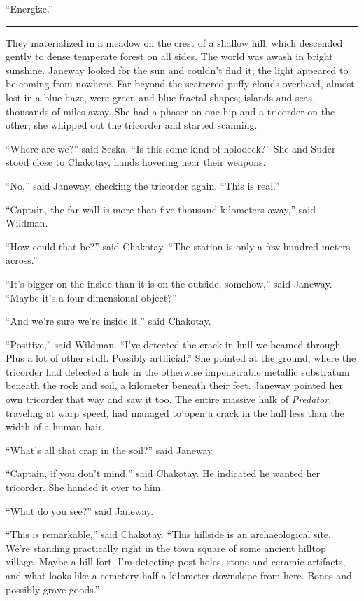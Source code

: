 \documentclass[twoside,letterpaper,12pt]{memoir}
\begin{document}
``Energize.'' 

\fancybreak{\rule{3cm}{0.4 pt}} 

They materialized in a meadow on the crest of a shallow hill, which descended gently to dense temperate forest on all sides. The world was awash in bright sunshine. Janeway looked for the sun and couldn't find it; the light appeared to be coming from nowhere. Far beyond the scattered puffy clouds overhead, almost lost in a blue haze, were green and blue fractal shapes; islands and seas, thousands of miles away. She had a phaser on one hip and a tricorder on the other; she whipped out the tricorder and started scanning. 

``Where are we?'' said Seska. ``Is this some kind of holodeck?'' She and Suder stood close to Chakotay, hands hovering near their weapons. 

``No,'' said Janeway, checking the tricorder again. ``This is real.'' 

``Captain, the far wall is more than five thousand kilometers away,'' said Wildman. 

``How could that be?'' said Chakotay. ``The station is only a few hundred meters across.'' 

``It's bigger on the inside than it is on the outside, somehow,'' said Janeway. ``Maybe it’s a four dimensional object?'' 

``And we're sure we're inside it,'' said Chakotay. 

``Positive,'' said Wildman. ``I've detected the crack in hull we beamed through. Plus a lot of other stuff. Possibly artificial.'' She pointed at the ground, where the tricorder had detected a hole in the otherwise impenetrable metallic substratum beneath the rock and soil, a kilometer beneath their feet. Janeway pointed her own tricorder that way and saw it too. The entire massive hulk of \textit{Predator}, traveling at warp speed, had managed to open a crack in the hull less than the width of a human hair. 

``What's all that crap in the soil?'' said Janeway. 

``Captain, if you don't mind,'' said Chakotay. He indicated he wanted her tricorder. She handed it over to him. 

``What do you see?'' said Janeway. 

``This is remarkable,'' said Chakotay. ``This hillside is an archaeological site. We're standing practically right in the town square of some ancient hilltop village. Maybe a hill fort. I'm detecting post holes, stone and ceramic artifacts, and what looks like a cemetery half a kilometer downslope from here. Bones and possibly grave goods.'' 
\end{document}
